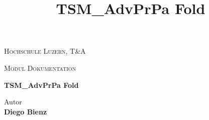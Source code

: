 
\begin{center}
\vspace{1.5cm}
{\scshape\LARGE Hochschule Luzern, T\&A \par}
{\scshape\Large Modul Dokumentation\par}
\vspace{2.0cm}
\title{TSM\_AdvPrPa Fold}
{\huge\bfseries TSM\_AdvPrPa Fold\par}

\vspace{16.0cm}

\end{center}

Autor \\
\textbf{Diego Bienz} \\


